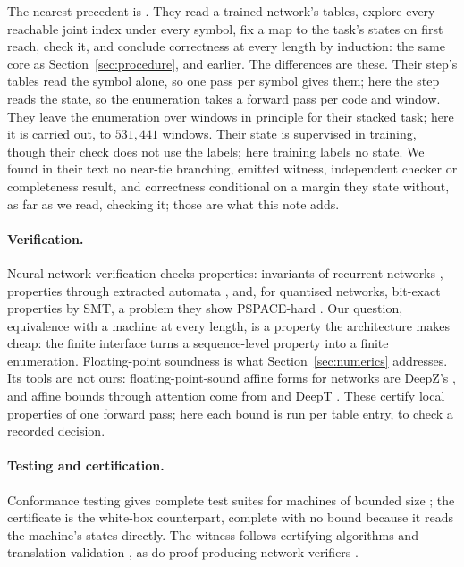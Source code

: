 \documentclass[11pt]{article}
\theoremstyle{definition}
\begin{document}
The nearest precedent is \citet{brandoit-2026-length-independent-state-tracking}. They read a trained
network's tables, explore every reachable joint index under every symbol, fix a map to the task's states on
first reach, check it, and conclude correctness at every length by induction: the same core as
Section~\ref{sec:procedure}, and earlier. The differences are these. Their step's tables read the symbol
alone, so one pass per symbol gives them; here the step reads the state, so the enumeration takes a forward
pass per code and window. They leave the enumeration over windows in principle for their stacked task; here
it is carried out, to $531{,}441$ windows. Their state is supervised in training, though their check does
not use the labels; here training labels no state. We found in their text no near-tie branching, emitted
witness, independent checker or completeness result, and correctness conditional on a margin they state
without, as far as we read, checking it; those are what this note adds.

\paragraph{Verification.} Neural-network verification checks properties: invariants of recurrent
networks \citep{jacoby-2020-verifying-rnn-invariant-inference}, properties through extracted automata
\citep{khmelnitsky-2021-property-directed-verification-rnn}, and, for quantised networks, bit-exact
properties by SMT, a problem they show PSPACE-hard \citep{henzinger-2021-scalable-verification-quantized-nn}. Our
question, equivalence with a machine at every length, is a property the architecture makes cheap:
the finite interface turns a sequence-level property into a finite enumeration. Floating-point
soundness \citep{jia-2021-exploiting-verified-nn-floating-point} is what Section~\ref{sec:numerics}
addresses. Its tools are not ours: floating-point-sound affine forms for networks are DeepZ's
\citep{singh-2018-fast-effective-robustness-certification}, and affine bounds through attention come from
\citet{shi-2020-robustness-verification-transformers} and DeepT
\citep{bonaert-2021-fast-precise-certification-transformers}. These certify local properties of one forward
pass; here each bound is run per table entry, to check a recorded decision.

\paragraph{Testing and certification.} Conformance testing gives complete test suites for machines of
bounded size \citep{chow-1978-testing-software-design-finite-state-machines,vasilevskii-1973-failure-diagnosis-automata,kocsis-2024-complete-test-suites-monoidal-closed};
the certificate is the white-box counterpart, complete with no bound because it reads the machine's
states directly. The witness follows certifying algorithms \citep{mcconnell-2011-certifying-algorithms}
and translation validation \citep{pnueli-1998-translation-validation}, as do proof-producing network
verifiers \citep{isac-2022-neural-network-verification-proof-production,desmartin-2024-certified-proof-checker-imandra}.
\end{document}
